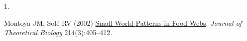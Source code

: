 \documentclass[9pt,twocolumn,twoside,]{pnas-new}
\newlength{\cslhangindent}
\newlength{\csllabelwidth}
\newlength{\cslentryspacingunit} %
\newenvironment{CSLReferences}[2] %
 {%
  \setlength{\parindent}{0pt}
  \ifodd #1
  \let\oldpar\par
  \def\par{\hangindent=\cslhangindent\oldpar}
  \fi
  \setlength{\parskip}{#2\cslentryspacingunit}
 }%
 {}
\newcommand{\CSLLeftMargin}[1]{\parbox[t]{\csllabelwidth}{#1}}
\newcommand{\CSLRightInline}[1]{\parbox[t]{\linewidth - \csllabelwidth}{#1}\break}
\begin{document}
\hypertarget{refs}{}
\begin{CSLReferences}{0}{0}
\leavevmode{}%
\CSLLeftMargin{1. }
\CSLRightInline{Montoya JM, Solé RV (2002)
\href{https://doi.org/10.1006/jtbi.2001.2460}{Small {World} {Patterns}
in {Food} {Webs}}. \emph{Journal of Theoretical Biology}
214(3):405--412.}

\end{CSLReferences}



% 
\end{document}
